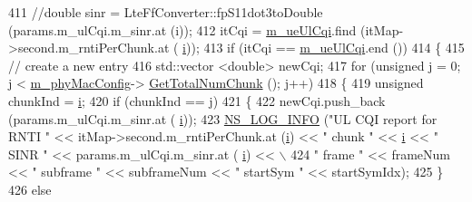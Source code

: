 \begin{DoxyCode}
411                                 \textcolor{comment}{//double sinr = LteFfConverter::fpS11dot3toDouble (params.m\_ulCqi.m\_sinr.at
       (i));}
412                                 itCqi = \hyperlink{classns3_1_1MmWaveFlexTtiMacScheduler_a1b7ed5c8fa4442252efa7cc43318f463}{m\_ueUlCqi}.find (itMap->second.m\_rntiPerChunk.at (
      \hyperlink{bernuolliDistribution_8m_a6f6ccfcf58b31cb6412107d9d5281426}{i}));
413                                 \textcolor{keywordflow}{if} (itCqi == \hyperlink{classns3_1_1MmWaveFlexTtiMacScheduler_a1b7ed5c8fa4442252efa7cc43318f463}{m\_ueUlCqi}.end ())
414                                 \{
415                                         \textcolor{comment}{// create a new entry}
416                                         std::vector <double> newCqi;
417                                         \textcolor{keywordflow}{for} (\textcolor{keywordtype}{unsigned} j = 0; j < \hyperlink{classns3_1_1MmWaveMacScheduler_a24d7af4971d2e500fe543cefbafa2fd9}{m\_phyMacConfig}->
      \hyperlink{classns3_1_1MmWavePhyMacCommon_a97e82c809a351fea9d5058ac1bb4c3c6}{GetTotalNumChunk} (); j++)
418                                         \{
419                                                 \textcolor{keywordtype}{unsigned} chunkInd = \hyperlink{bernuolliDistribution_8m_a6f6ccfcf58b31cb6412107d9d5281426}{i};
420                                                 \textcolor{keywordflow}{if} (chunkInd == j)
421                                                 \{
422                                                         newCqi.push\_back (params.m\_ulCqi.m\_sinr.at (
      \hyperlink{bernuolliDistribution_8m_a6f6ccfcf58b31cb6412107d9d5281426}{i}));
423                                                         \hyperlink{group__logging_gafbd73ee2cf9f26b319f49086d8e860fb}{NS\_LOG\_INFO} (\textcolor{stringliteral}{"UL CQI report for RNTI "} 
      << itMap->second.m\_rntiPerChunk.at (\hyperlink{bernuolliDistribution_8m_a6f6ccfcf58b31cb6412107d9d5281426}{i}) << \textcolor{stringliteral}{" chunk "} << \hyperlink{bernuolliDistribution_8m_a6f6ccfcf58b31cb6412107d9d5281426}{i} << \textcolor{stringliteral}{" SINR "} << params.m\_ulCqi.m\_sinr.at (
      \hyperlink{bernuolliDistribution_8m_a6f6ccfcf58b31cb6412107d9d5281426}{i}) << \(\backslash\)
424                                                                      \textcolor{stringliteral}{" frame "} << frameNum << \textcolor{stringliteral}{" subframe "} 
      << subframeNum << \textcolor{stringliteral}{" startSym "} << startSymIdx);
425                                                 \}
426                                                 \textcolor{keywordflow}{else}

\end{DoxyCode}
